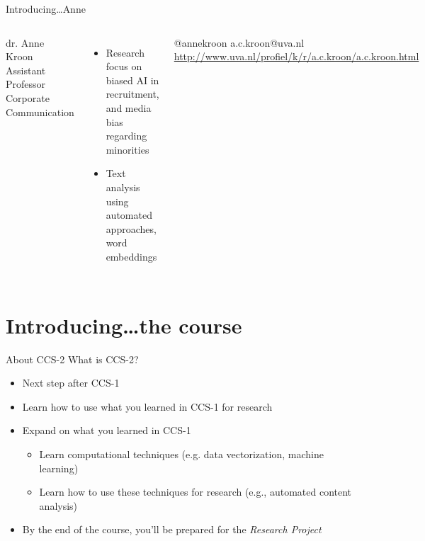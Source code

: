 \documentclass[handout]{beamer}
\begin{document}
\begin{frame}{Introducing\ldots \huge{Anne}} 
	\begin{columns}[]    dr. Anne Kroon \\ 
		Assistant Professor Corporate Communication
		\begin{itemize} 
			\item Research focus on biased AI in recruitment, and media bias regarding minorities
			\item Text analysis using automated approaches, word embeddings
		\end{itemize} @annekroon \textbar a.c.kroon@uva.nl  \textbar \\ \url{http://www.uva.nl/profiel/k/r/a.c.kroon/a.c.kroon.html} 
	\end{columns} 
\end{frame}


\section[The course]{Introducing\ldots the course}

\begin{frame}{About CCS-2} 
What is CCS-2?
	\begin{itemize}
		\item Next step after CCS-1 
		\item Learn how to use what you learned in CCS-1 for research
		\item Expand on what you learned in CCS-1
		\begin{itemize}
			\item Learn computational techniques (e.g. data vectorization, machine learning)
			\item Learn how to use these techniques for research (e.g., automated content analysis)
		\end{itemize}
		\item By the end of the course, you'll be prepared for the \emph{Research Project}
	\end{itemize}
	
\end{frame}
\end{document}

